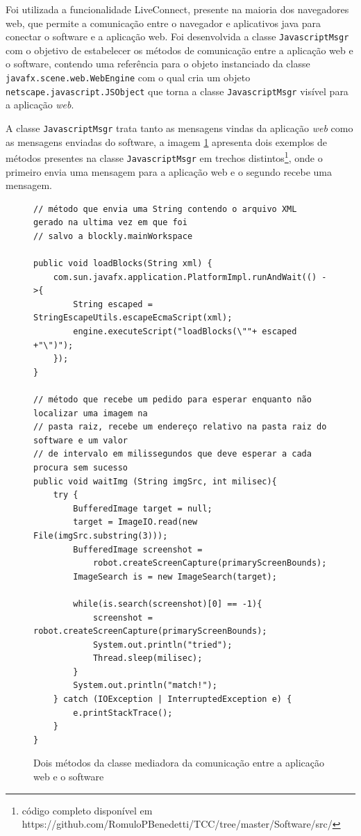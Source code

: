 \documentclass[tg]{mdtufsm}
\begin{document}
                    Foi utilizada a funcionalidade LiveConnect, presente na maioria dos navegadores web, que permite a comunicação entre o navegador e aplicativos java para conectar o software e a aplicação web. Foi desenvolvida a classe \texttt{JavascriptMsgr} com o objetivo de estabelecer os métodos de comunicação entre a aplicação web e o software, contendo uma referência para o objeto instanciado da classe \texttt{javafx.scene.web.WebEngine} com o qual cria um objeto \texttt{netscape.javascript.JSObject} que torna a classe \texttt{JavascriptMsgr} visível para a aplicação \emph{web}.

                    A classe \texttt{JavascriptMsgr} trata tanto as mensagens vindas da aplicação \emph{web} como as mensagens enviadas do software, a imagem \ref{code:javascriptmsg.java} apresenta dois exemplos de métodos presentes na classe \texttt{JavascriptMsgr} em trechos distintos\footnote{código completo disponível em https://github.com/RomuloPBenedetti/TCC/tree/master/Software/src/}, onde o primeiro envia uma mensagem para a aplicação web e o segundo recebe uma mensagem.


\begin{figure}[!htb]
\begin{lstlisting}
// método que envia uma String contendo o arquivo XML gerado na ultima vez em que foi
// salvo a blockly.mainWorkspace

public void loadBlocks(String xml) {
    com.sun.javafx.application.PlatformImpl.runAndWait(() ->{
        String escaped = StringEscapeUtils.escapeEcmaScript(xml);
        engine.executeScript("loadBlocks(\""+ escaped +"\")");
    });
}

// método que recebe um pedido para esperar enquanto não localizar uma imagem na
// pasta raiz, recebe um endereço relativo na pasta raiz do software e um valor
// de intervalo em milissegundos que deve esperar a cada procura sem sucesso
public void waitImg (String imgSrc, int milisec){
    try {
        BufferedImage target = null;
        target = ImageIO.read(new File(imgSrc.substring(3)));
        BufferedImage screenshot =
            robot.createScreenCapture(primaryScreenBounds);
        ImageSearch is = new ImageSearch(target);

        while(is.search(screenshot)[0] == -1){
            screenshot = robot.createScreenCapture(primaryScreenBounds);
            System.out.println("tried");
            Thread.sleep(milisec);
        }
        System.out.println("match!");
    } catch (IOException | InterruptedException e) {
        e.printStackTrace();
    }
}
\end{lstlisting}
    \caption{Dois métodos da classe mediadora da comunicação entre a aplicação web e o software}
	\label{code:javascriptmsg.java}
\end{figure}
\end{document}
